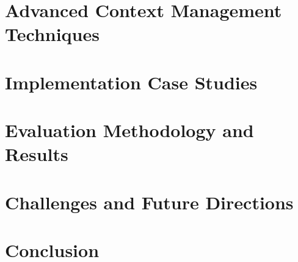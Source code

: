 \documentclass[10pt,a4paper]{article}
\begin{document}
\section{Advanced Context Management Techniques}


\section{Implementation Case Studies}


\section{Evaluation Methodology and Results}


\section{Challenges and Future Directions}


\section{Conclusion}

\end{document}
